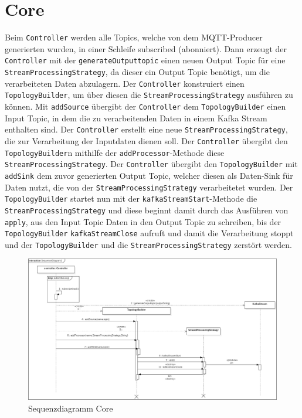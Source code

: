 \section{Core}
Beim \texttt{Controller} werden alle Topics, welche von dem MQTT-Producer generierten wurden, in einer Schleife subscribed (abonniert). Dann erzeugt der \texttt{Controller} mit der \texttt{generateOutputtopic} einen neuen Output Topic für eine \texttt{StreamProcessingStrategy}, da dieser ein Output Topic benötigt, um die verarbeiteten Daten abzulagern.
Der \texttt{Controller} konstruiert einen \texttt{TopologyBuilder}, um über diesen die \texttt{StreamProcessingStrategy} ausführen zu können. Mit \texttt{addSource} übergibt der \texttt{Controller} dem \texttt{TopologyBuilder} einen Input Topic, in dem die zu verarbeitenden Daten in einem Kafka Stream enthalten sind.
Der \texttt{Controller} erstellt eine neue \texttt{StreamProcessingStrategy}, die zur Verarbeitung der Inputdaten dienen soll. Der \texttt{Controller} übergibt den \texttt{TopologyBuilder}n mithilfe der \texttt{addProcessor}-Methode diese \texttt{StreamProcessingStrategy}.
Der \texttt{Controller} übergibt den \texttt{TopologyBuilder} mit \texttt{addSink} dem zuvor generierten Output Topic, welcher diesen als Daten-Sink für Daten nutzt, die von der \texttt{StreamProcessingStrategy} verarbeitetet wurden.
Der \texttt{TopologyBuilder} startet nun mit der \texttt{kafkaStreamStart}-Methode die \texttt{StreamProcessingStrategy} und diese beginnt damit durch das Ausführen von \texttt{apply}, aus den Input Topic Daten in den Output Topic zu schreiben, bis der \texttt{TopologyBuilder} \texttt{kafkaStreamClose} aufruft und damit die Verarbeitung stoppt und der \texttt{TopologyBuilder} und die \texttt{StreamProcessingStrategy} zerstört werden.
\begin{figure}[!hbp]
	\centering
	\includegraphics[width=\linewidth]{images/core/CoreSequenceDiagram.png}
	\caption{Sequenzdiagramm Core}
\end{figure}
\newpage

